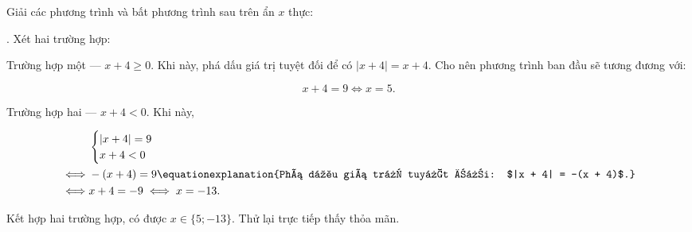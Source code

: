 \exercise Giải các phương trình và bất phương trình sau trên ẩn $x$ thực:


\solution

\setcounter{subexercise}{1}
. Xét hai trường hợp:

\textcolor{colorEmphasisCyan}{Trường hợp một --- $x + 4 \geq 0$}. Khi này, phá dấu giá trị tuyệt đối để có $|x + 4| = x + 4$. Cho nên phương trình ban đầu sẽ tương đương với:

\begin{equation*}
   x + 4 = 9 \iff x = 5.
\end{equation*}

\textcolor{colorEmphasis}{Trường hợp hai --- $x + 4 < 0$}. Khi này,

\begin{align*}
   &\begin{cases}
      |x + 4| = 9 \\
      x + 4 < 0
   \end{cases} \\
   \iff &-(x + 4) = 9 \equationexplanation{Phá dấu giá trị tuyệt đối: $|x + 4| = -(x + 4)$.}\\
   \iff &x + 4 = -9 \iff x = -13.
\end{align*}

Kết hợp hai trường hợp, có được $x \in \{5; -13\}$. Thử lại trực tiếp thấy thỏa mãn.

